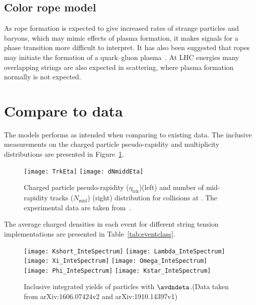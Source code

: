 \documentclass[ALICE,manyauthors]{StrinJet}
\begin{document}
\subsection{Color rope model}
\label{subsec:rope}

As rope formation is expected to give increased rates of strange particles and baryons, which may mimic effects of plasma formation, it makes signals for a phase transition more difficult to interpret.
It has also been suggested that ropes may initiate the formation of a quark–gluon plasma~\cite{Gyulassy:1985oqt, Kajantie:1985jh, Gatoff:1987uf, Braun:1997ch}.
At LHC energies many overlapping strings are also expected in \pp scattering, where plasma formation normally is not expected.

\section{Compare to data}
\label{sec:com2da}
The models performs as intended when comparing to existing data.
The inclusive measurements on the charged particle pseudo-rapidity and multiplicity distributions are presented in Figure~\ref{fig:trkinfo}.
\begin{figure}[htp]
	\begin{center}
		\texttt{[image: TrkEta]}
		\texttt{[image: dNmiddEta]}
	\end{center}
	\caption{Charged particle pseudo-rapidity ($\eta_\mathrm{trk}$)(left) and number of mid-rapidity tracks ($N_\mathrm{mid}$) (right) distribution for \pp collisions at \seven.  The experimental data are taken from~\cite{ALICE:2010mty}.}
	\label{fig:trkinfo}
\end{figure}

The average charged densities in each event for different string tension implementations are presented in Table~\ref{tab:eventclass}.

\begin{figure}[ht]
	\begin{center}
		\texttt{[image: Kshort\_InteSpectrum]}
		\texttt{[image: Lambda\_InteSpectrum]}
		\texttt{[image: Xi\_InteSpectrum]}
		\texttt{[image: Omega\_InteSpectrum]}
		\texttt{[image: Phi\_InteSpectrum]}
		\texttt{[image: Kstar\_InteSpectrum]}
	\end{center}
	\caption{Inclusive integrated yields of particles with $\avdndeta$.(Data taken from arXiv:1606.07424v2 and arXiv:1910.14397v1)}
	\label{fig:InclIntePar}
\end{figure}
\end{document}
